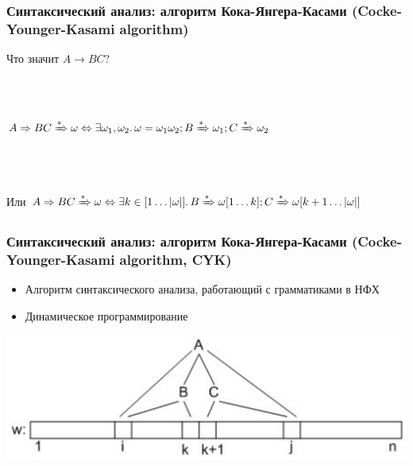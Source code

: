 \documentclass{beamer}
\newcommand{\derive}[0]{\xRightarrow[]{*}}
\begin{document}
\begin{frame}[fragile]
  \transwipe[direction=90]
  \frametitle{Синтаксический анализ: алгоритм Кока-Янгера-Касами (Cocke-Younger-Kasami algorithm)}
  Что значит $A \rightarrow BC$? \pause
  
  ~\\~
  
  $A \Rightarrow BC  \derive \omega \Leftrightarrow \exists \omega_1, \omega_2 . \, \omega = \omega_1 \omega_2; B \derive \omega_1; C \derive \omega_2$ \pause
  
  ~\\~
  
  Или $A \Rightarrow BC  \derive \omega \Leftrightarrow \exists k \in [1 \dots |\omega|]. \,  B \derive \omega[1\dots k]; C \derive \omega[k+1 \dots |\omega|]$
\end{frame}

\begin{frame}[fragile]
  \transwipe[direction=90]
  \frametitle{Синтаксический анализ: алгоритм Кока-Янгера-Касами (Cocke-Younger-Kasami algorithm, CYK)}
  \begin{itemize}
      \item Алгоритм синтаксического анализа, работающий с грамматиками в НФХ
      \item Динамическое программирование
  \end{itemize}

  \begin{center}
    \includegraphics[width=\textwidth]{pics/CYK.png}  
  \end{center}
\end{frame}
\end{document}
